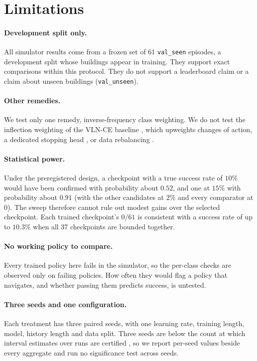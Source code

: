 \section{Limitations}
\label{sec:limitations}

\paragraph{Development split only.}
All simulator results come from a frozen set of 61 \texttt{val\_seen} episodes, a development split
whose buildings appear in training. They support exact comparisons within this protocol.
They do not support a leaderboard claim or a claim about unseen buildings (\texttt{val\_unseen}).

\paragraph{Other remedies.}
We test only one remedy, inverse-frequency class weighting. We do not test the inflection weighting
of the VLN-CE baseline \citep{wijmans2019eqa}, which upweights changes of action, a dedicated
stopping head \citep{xiang2020l2stop}, or data rebalancing \citep{cheng2025navila}.

\paragraph{Statistical power.}
Under the preregistered design, a checkpoint with a true success rate of $10\%$ would have been
confirmed with probability about $0.52$, and one at $15\%$ with probability about $0.91$ (with the
other candidates at $2\%$ and every comparator at $0$). The sweep therefore cannot rule out modest
gains over the selected checkpoint. Each trained checkpoint's $0/61$ is consistent with a success
rate of up to $10.3\%$ when all 37 checkpoints are bounded together.

\paragraph{No working policy to compare.}
Every trained policy here fails in the simulator, so the per-class checks are observed only on
failing policies. How often they would flag a policy that navigates, and whether passing them
predicts success, is untested.

\paragraph{Three seeds and one configuration.}
Each treatment has three paired seeds, with one learning rate, training length, model, history
length and data split. Three seeds are below the count at which interval estimates over runs are
certified \citep{agarwal2021rliable}, so we report per-seed values beside every aggregate and run
no significance test across seeds.

